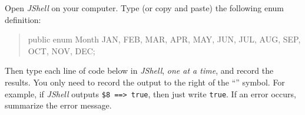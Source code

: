
Open \textit{JShell} on your computer.
Type (or copy and paste) the following enum definition:


\begin{quote}
\begin{javalst}
public enum Month {
    JAN, FEB, MAR, APR, MAY, JUN, JUL, AUG, SEP, OCT, NOV, DEC;
}
\end{javalst}
\end{quote}


Then type each line of code below in \textit{JShell}, \emph{one at a time}, and record the results.
You only need to record the output to the right of the ``\java{==>}'' symbol.
For example, if \textit{JShell} outputs \verb|$8 ==> true|, then just write \verb|true|.
If an error occurs, summarize the error message.

\setlength{\defaultwidth}{20.8em}

